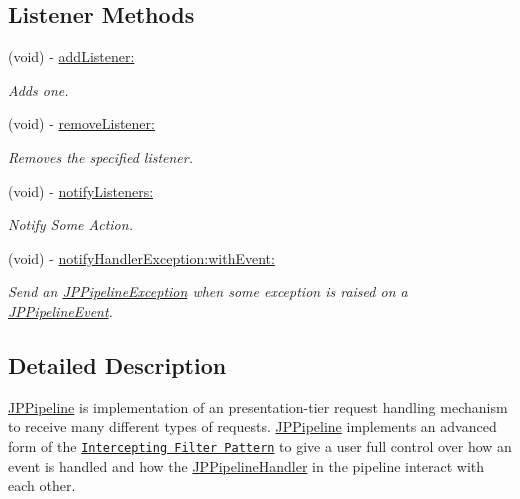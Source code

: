 \subsection*{Listener Methods}
\begin{DoxyCompactItemize}
\item 
(void) -\/ \hyperlink{a00019_a80a40b033f9cb8c7f824c8dec2ef77d1}{addListener:}
\begin{DoxyCompactList}\small\item\em Adds one. \item\end{DoxyCompactList}\item 
(void) -\/ \hyperlink{a00019_a68ebd93ad1d12386be9c2a15cea7f02e}{removeListener:}
\begin{DoxyCompactList}\small\item\em Removes the specified listener. \item\end{DoxyCompactList}\item 
(void) -\/ \hyperlink{a00019_ae5febca680fe89e98ed28152a9d1f817}{notifyListeners:}
\begin{DoxyCompactList}\small\item\em Notify Some Action. \item\end{DoxyCompactList}\item 
(void) -\/ \hyperlink{a00019_a189266004e4fd48d0da86ed2f7ea5bc2}{notifyHandlerException:withEvent:}
\begin{DoxyCompactList}\small\item\em Send an \hyperlink{a00026}{JPPipelineException} when some exception is raised on a \hyperlink{a00023}{JPPipelineEvent}. \item\end{DoxyCompactList}\end{DoxyCompactItemize}


\subsection{Detailed Description}
\hyperlink{a00019}{JPPipeline} is implementation of an presentation-\/tier request handling mechanism to receive many different types of requests. \hyperlink{a00019}{JPPipeline} implements an advanced form of the \href{http://java.sun.com/blueprints/corej2eepatterns/Patterns/InterceptingFilter.html}{\tt Intercepting Filter Pattern} to give a user full control over how an event is handled and how the \hyperlink{a00029}{JPPipelineHandler} in the pipeline interact with each other.

